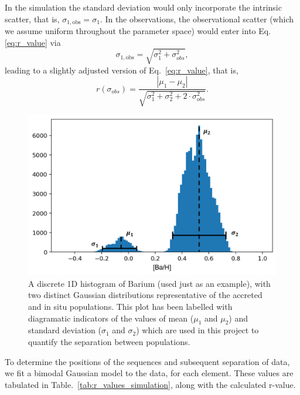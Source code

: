 \documentclass[fleqn,usenatbib]{mnras}
\begin{document}
In the simulation the standard deviation would only incorporate the intrinsic scatter, that is, $\sigma_{1,\text{obs}} = \sigma_1$. In the observations, the observational scatter (which we assume uniform throughout the parameter space) would enter into Eq. \ref{eq:r_value} via
\begin{equation} \label{eq:scatter}
    \sigma_{1,\text{obs}} = \sqrt{\sigma_1^2+\sigma_{obs}^2},
\end{equation}
leading to a slightly adjusted version of Eq.~\ref{eq:r_value}, that is,
\begin{equation} \label{eq:r_value_observed}
r (\sigma_{obs}) = \frac{|\mu_1 - \mu_2|}{\sqrt{\sigma_1^2 + \sigma_2^2 + 2\cdot \sigma_{obs}^2}}.
\end{equation}

\begin{figure}
	\includegraphics[width=\columnwidth]{figures/hist_labelled.png}
    \caption{A discrete 1D histogram of Barium (used just as an example), with two distinct Gaussian distributions representative of the accreted and in situ populations. This plot has been labelled with diagramatic indicators of the values of mean ($\mu_1$ and $\mu_2$) and standard deviation ($\sigma_1$ and $\sigma_2$) which are used in this project to quantify the separation between populations.}
    \label{fig:hist_labels}
\end{figure}

To determine the positions of the sequences and subsequent separation of data, we fit a bimodal Gaussian model to the data, for each element. These values are tabulated in Table.~\ref{tab:r_values_simulation}, along with the calculated r-value.\par 
\end{document}
